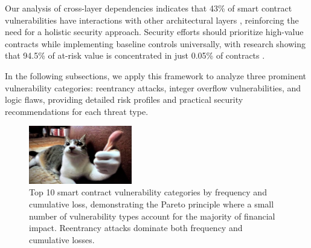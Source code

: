 Our analysis of cross-layer dependencies indicates that 43\% of smart contract vulnerabilities have interactions with other architectural layers \cite{praitheeshan2019systematic}, reinforcing the need for a holistic security approach. Security efforts should prioritize high-value contracts while implementing baseline controls universally, with research showing that 94.5\% of at-risk value is concentrated in just 0.05\% of contracts \cite{perez2021analysis}.

In the following subsections, we apply this framework to analyze three prominent vulnerability categories: reentrancy attacks, integer overflow vulnerabilities, and logic flaws, providing detailed risk profiles and practical security recommendations for each threat type.


\begin{figure}[H]
\centering
\includegraphics[width=0.4\textwidth]{../figure/fig2.png}
\caption{Top 10 smart contract vulnerability categories by frequency and cumulative loss, demonstrating the Pareto principle where a small number of vulnerability types account for the majority of financial impact. Reentrancy attacks dominate both frequency and cumulative losses.}
\label{fig:smart_contract_pareto}
\end{figure}